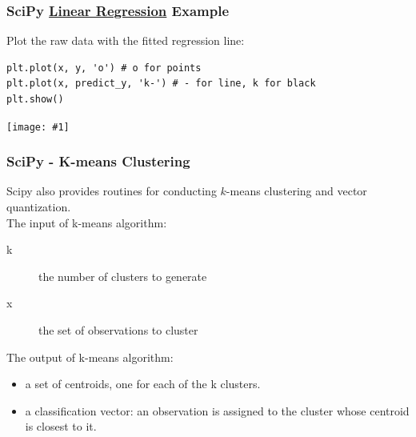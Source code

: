 \documentclass[xcolor=svgnames, handout]{beamer}
\newcommand{\nl}{\\[1em]}
\newcommand{\ipic}[2]{\texttt{[image: \#1]}}
\newcommand{\ft}[1]{\frametitle{#1}}
\begin{document}
\begin{frame}[fragile]\ft{SciPy \href{https://docs.scipy.org/doc/scipy/reference/generated/scipy.stats.linregress.html}{Linear Regression} Example}
Plot the raw data with the fitted regression line:
\begin{Verbatim}[xleftmargin=-.1in, fontsize=\small, commandchars=\\\{\}, frame=single] 
plt.plot(x, y, 'o') # o for points
plt.plot(x, predict_y, 'k-') # - for line, k for black
plt.show()
\end{Verbatim}
\begin{center}
\ipic{LR}{0.7}
\end{center}
\end{frame}

\begin{frame}
[fragile]\ft{SciPy - K-means Clustering}


Scipy also provides routines for conducting $k$-means clustering and vector quantization.\nl

The input of k-means algorithm:
\begin{description}
\item[k] the number of clusters to generate
\item[x] the set of observations to cluster
\end{description}
The output of k-means algorithm: 
\begin{itemize}
\item a set of centroids, one for each of the k clusters.
\item  a classification vector:  an observation is assigned to the cluster whose centroid is closest to it.
\end{itemize}
\end{frame}
\end{document}
